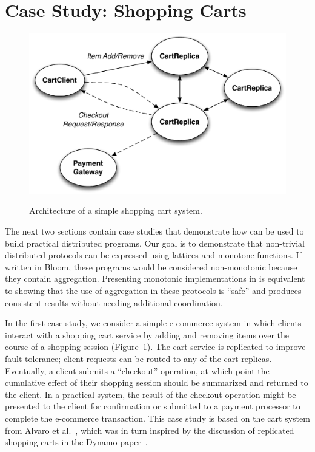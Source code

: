 \section{Case Study: Shopping Carts}
\label{sec:carts}
\begin{figure}[t]
\includegraphics[width=\linewidth]{fig/cart_arch.pdf}
\label{fig:cart-system}
\caption{Architecture of a simple shopping cart system.}
\end{figure}

The next two sections contain case studies that demonstrate how \lang can be
used to build practical distributed programs. Our goal is to demonstrate that
non-trivial distributed protocols can be expressed using lattices and monotone
functions. If written in Bloom, these programs would be considered non-monotonic
because they contain aggregation. Presenting monotonic implementations in \lang
is equivalent to showing that the use of aggregation in these protocols is
``safe'' and produces consistent results without needing additional
coordination.

In the first case study, we consider a simple e-commerce system in which clients
interact with a shopping cart service by adding and removing items over the
course of a shopping session (Figure~\ref{fig:cart-system}). The cart service is
replicated to improve fault tolerance; client requests can be routed to any of
the cart replicas. Eventually, a client submits a ``checkout'' operation, at
which point the cumulative effect of their shopping session should be summarized
and returned to the client. In a practical system, the result of the checkout
operation might be presented to the client for confirmation or submitted to a
payment processor to complete the e-commerce transaction. This case study is
based on the cart system from Alvaro et al.~\cite{Alvaro2011}, which was in turn
inspired by the discussion of replicated shopping carts in the Dynamo
paper~\cite{DeCandia2007}.

